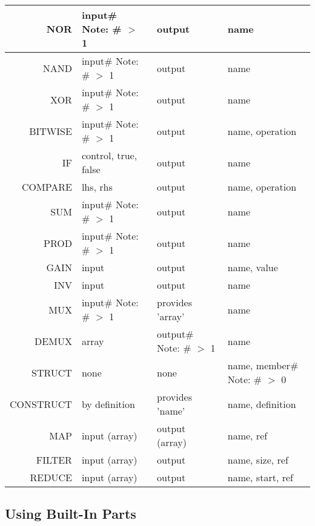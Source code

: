 \begin{longtable}[c]{ |r|l|l|l| }
    \hline
    NOR & \specialcell{input\# \\ Note: \# $>$ 1} & output & name \\
    \hline
    NAND & \specialcell{input\# \\ Note: \# $>$ 1} & output & name \\
    \hline
    XOR & \specialcell{input\# \\ Note: \# $>$ 1} & output & name \\
    \hline
    BITWISE & \specialcell{input\# \\ Note: \# $>$ 1} & output & name, operation \\
    \hline
    IF & control, true, false & output & name \\
    \hline
    COMPARE & lhs, rhs  & output & name, operation \\
    \hline
    SUM & \specialcell{input\# \\ Note: \# $>$ 1} & output & name \\
    \hline
    PROD & \specialcell{input\# \\ Note: \# $>$ 1} & output & name \\
    \hline
    GAIN & input & output & name, value \\
    \hline
    INV & input & output & name \\
    \hline
    \hline
    MUX & \specialcell{input\# \\ Note: \# $>$ 1} & provides 'array' & name \\
    \hline
    DEMUX & array & \specialcell{output\# \\ Note: \# $>$ 1} & name \\
    \hline
    STRUCT & none & none & name, \specialcell{member\# \\ Note: \# $>$ 0} \\
    \hline
    CONSTRUCT & by definition & provides 'name' & name, definition \\
    \hline
    \hline
    MAP & input (array) & output (array) & name, ref \\
    \hline
    FILTER & input (array) & output & name, size, ref \\
    \hline
    REDUCE & input (array) & output & name, start, ref \\
    \hline
\end{longtable}
\subsection{Using Built-In Parts}
